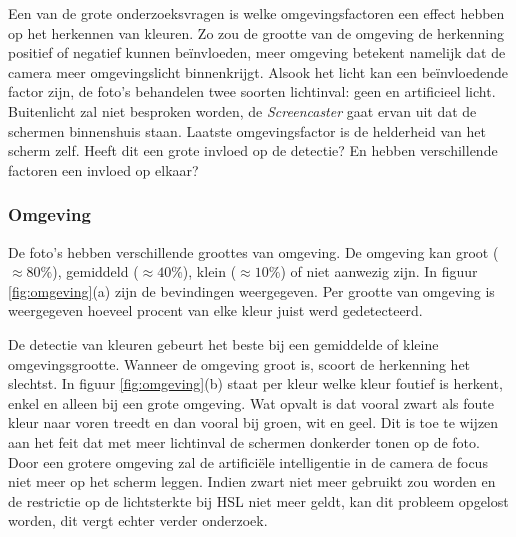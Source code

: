 Een van de grote onderzoeksvragen is welke omgevingsfactoren een effect hebben op het herkennen van kleuren. Zo zou de grootte van de omgeving de herkenning positief of negatief kunnen beïnvloeden, meer omgeving betekent namelijk dat de camera meer omgevingslicht binnenkrijgt. Alsook het licht kan een beïnvloedende factor zijn, de foto's behandelen twee soorten lichtinval: geen en artificieel licht. Buitenlicht zal niet besproken worden, de {\it Screencaster} gaat ervan uit dat de schermen binnenshuis staan. Laatste omgevingsfactor is de helderheid van het scherm zelf. Heeft dit een grote invloed op de detectie? En hebben verschillende factoren een invloed op elkaar?

\subsubsection{Omgeving}
De foto's hebben verschillende groottes van omgeving. De omgeving kan groot ($\approx 80\%$), gemiddeld ($\approx 40\%$), klein ($\approx 10\%$) of niet aanwezig zijn. In figuur \ref{fig:omgeving}(a) zijn de bevindingen weergegeven. Per grootte van omgeving is weergegeven hoeveel procent van elke kleur juist werd gedetecteerd.

De detectie van kleuren gebeurt het beste bij een gemiddelde of kleine omgevingsgrootte. Wanneer de omgeving groot is, scoort de herkenning het slechtst. In figuur \ref{fig:omgeving}(b) staat per kleur welke kleur foutief is herkent, enkel en alleen bij een grote omgeving. Wat opvalt is dat vooral zwart als foute kleur naar voren treedt en dan vooral bij groen, wit en geel. Dit is toe te wijzen aan het feit dat met meer lichtinval de schermen donkerder tonen op de foto. Door een grotere omgeving zal de artificiële intelligentie in de camera de focus niet meer op het scherm leggen. Indien zwart niet meer gebruikt zou worden en de restrictie op de lichtsterkte bij HSL niet meer geldt, kan dit probleem opgelost worden, dit vergt echter verder onderzoek.

